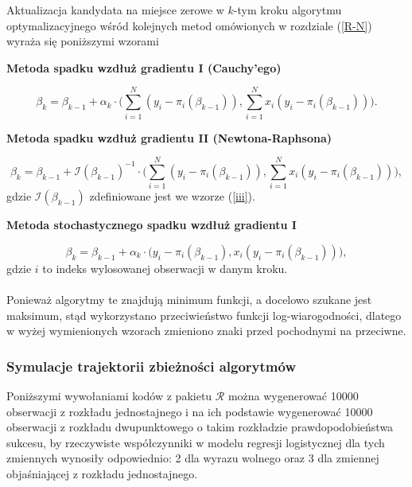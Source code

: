 Aktualizacja kandydata na miejsce zerowe w $k$-tym kroku algorytmu optymalizacyjnego wśród kolejnych metod omówionych w rozdziale (\ref{R-N}) wyraża się poniższymi wzorami
\\
\begin{center}
\textbf{Metoda spadku wzdłuż gradientu I (Cauchy’ego)}
\end{center}
\begin{equation*}
\beta_{k} = \beta_{k-1} + \alpha_{k}\cdot\Big(\sum\limits_{i=1}^{N}(y_i-\pi_i(\beta_{k-1})), \sum\limits_{i=1}^{N}x_i(y_i-\pi_i(\beta_{k-1}))\Big).
\end{equation*}
\begin{center}
\textbf{Metoda spadku wzdłuż gradientu II (Newtona-Raphsona)}
\end{center}
\begin{equation*}
\beta_{k} = \beta_{k-1} + \mathscr{I}(\beta_{k-1})^{-1}\cdot\Big(\sum\limits_{i=1}^{N}(y_i-\pi_i(\beta_{k-1})), \sum\limits_{i=1}^{N}x_i(y_i-\pi_i(\beta_{k-1}))\Big),
\end{equation*}
gdzie $\mathscr{I}(\beta_{k-1})$ zdefiniowane jest we wzorze (\ref{iii}). 
\begin{center}
\textbf{Metoda stochastycznego spadku wzdłuż gradientu I}
\end{center}
\begin{equation*}
\beta_{k} = \beta_{k-1} + \alpha_{k}\cdot\Big(y_i-\pi_i(\beta_{k-1}), x_i(y_i-\pi_i(\beta_{k-1}))\Big),
\end{equation*}
gdzie $i$ to indeks wylosowanej obserwacji w danym kroku.
\\ \ \\
Ponieważ algorytmy te znajdują minimum funkcji, a docelowo szukane jest maksimum, stąd wykorzystano przeciwieństwo funkcji log-wiarogodności, dlatego w wyżej wymienionych wzorach zmieniono znaki przed pochodnymi na przeciwne.

\newpage
\subsubsection{Symulacje trajektorii zbieżności algorytmów}
Poniższymi wywołaniami kodów z pakietu $\mathcal{R}$ można wygenerować 10000 obserwacji z rozkładu jednostajnego i na ich podstawie wygenerować 10000 obserwacji z rozkładu dwupunktowego o takim rozkładzie prawdopodobieństwa sukcesu, by rzeczywiste współczynniki w modelu regresji logistycznej dla tych zmiennych wynosiły odpowiednio: 2 dla wyrazu wolnego oraz 3 dla zmiennej objaśniającej z rozkładu jednostajnego. 
\begin{Shaded}
\begin{Highlighting}[]
\StringTok{ }\NormalTok{(}\NormalTok{)}
\StringTok{ } \NormalTok{+}\StringTok{ }
\StringTok{ }\NormalTok{/(}\NormalTok{+}
\StringTok{ }\NormalTok{(}\NormalTok{,}
\end{Highlighting}
\end{Shaded}

